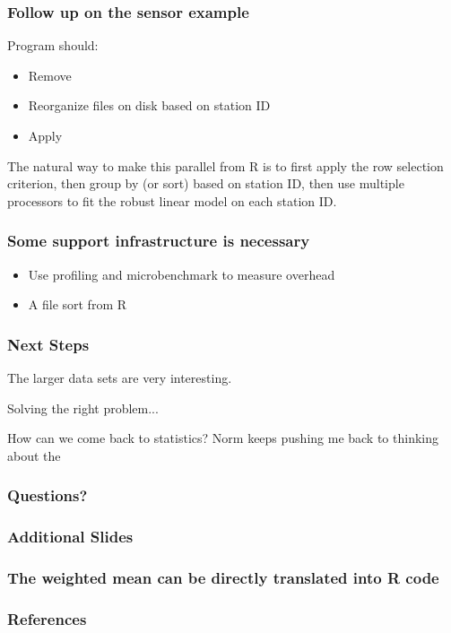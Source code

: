 \documentclass{beamer}
\begin{document}
\begin{frame}

    \frametitle{Follow up on the sensor example}

    Program should:

\begin{itemize}
    \item Remove
    \item Reorganize files on disk based on station ID
    \item Apply 
\end{itemize}

    The natural way to make this parallel from R is to first apply the
    row selection criterion, then group by (or
    sort) based on station ID, then use multiple processors to fit the
    robust linear model on each station ID.

\end{frame}
\begin{frame}

    \frametitle{Some support infrastructure is necessary}

\begin{itemize}
\item Use profiling and microbenchmark to measure overhead
\item A file sort from R
\end{itemize}


\end{frame}
\begin{frame}

    \frametitle{Next Steps}

    The larger data sets are very interesting. 

    Solving the right problem...
    
    How can we come back
    to statistics? Norm keeps pushing me back to thinking about the 

\end{frame}
\begin{frame}

    \frametitle{Questions?}

\end{frame}
\begin{frame}

    \frametitle{Additional Slides}

\end{frame}
\begin{frame}

    \frametitle{The weighted mean can be directly translated into R code}

\end{frame}
\begin{frame}
\frametitle{References}
\printbibliography
\end{frame}
\end{document}
